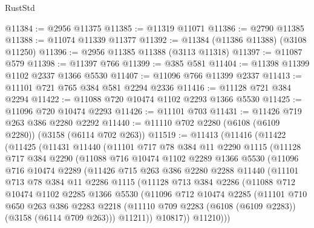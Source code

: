 \begin{lexlean}{RustStd}
\begin{coremodule}
{\begin{coremodule}
{{{{{{{{{{{{{{{{{{{{{{{{{{@11384 := @2956 @11375
@11385 := @11319 @11071
@11386 := @2790 @11385
@11388 := @11074 @11339 @11377
@11392 := @11384 (@11386 @11388) (@3108 @11250)
@11396 := @2956 @11385 @11388 (@3113 @11318)
@11397 := @11087 @579
@11398 := @11397 @766
@11399 := @385 @581
@11404 := @11398 @11399 @1102 @2337 @1366 @5530
@11407 := @11096 @766 @11399 @2337
@11413 := @11101 @721 @765 @384 @581 @2294 @2336
@11416 := @11128 @721 @384 @2294
@11422 := @11088 @720 @10474 @1102 @2293 @1366 @5530
@11425 := @11096 @720 @10474 @2293
@11426 := @11101 @703
@11431 := @11426 @719 @263 @386 @2280 @2292
@11440 := @11110 @702 @2280 (@6108 (@6109 @2280)) (@3158 (@6114 @702 @263))
@11519 := @11413
    (@11416
      (@11422
        (@11425
          (@11431
            @11440
            (@11101
              @717
              @78
              @384
              @11
              @2290
              @1115
              (@11128
                @717
                @384
                @2290
                (@11088
                  @716
                  @10474
                  @1102
                  @2289
                  @1366
                  @5530
                  (@11096
                    @716
                    @10474
                    @2289
                    (@11426
                      @715
                      @263
                      @386
                      @2280
                      @2288
                      @11440
                      (@11101
                        @713
                        @78
                        @384
                        @11
                        @2286
                        @1115
                        (@11128
                          @713
                          @384
                          @2286
                          (@11088
                            @712
                            @10474
                            @1102
                            @2285
                            @1366
                            @5530
                            (@11096
                              @712
                              @10474
                              @2285
                              (@11101
                                @710
                                @650
                                @263
                                @386
                                @2283
                                @2218
                                (@11110 @709 @2283 (@6108 (@6109 @2283)) (@3158 (@6114 @709 @263)))
                                @11211))
                            @10817))
                        @11210)))
}}}}}}}}}}}}}}}}}}}}}}}}}}
\end{coremodule}}
\end{coremodule}
\end{lexlean}
